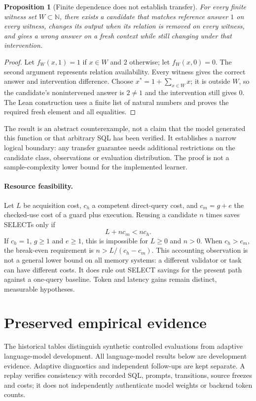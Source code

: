\documentclass[10pt,twocolumn]{article}
\newtheorem{proposition}{Proposition}
\begin{document}
\begin{proposition}[Finite dependence does not establish transfer]\label{prop:finite}
For every finite witness set $W\subset\mathbb N$, there exists a candidate that
matches reference answer $1$ on every witness, changes its output when its
relation is removed on every witness, and gives a wrong answer on a fresh
context while still changing under that intervention.
\end{proposition}
\begin{proof}
Let $f_W(x,1)=1$ if $x\in W$ and $2$ otherwise; let $f_W(x,0)=0$.
The second argument represents relation availability. Every witness gives the
correct answer and intervention difference. Choose
$x^*=1+\sum_{x\in W}x$; it is outside $W$, so the candidate's nonintervened
answer is $2\ne1$
and the intervention still gives $0$. The Lean construction uses a finite list
of natural numbers and proves the required fresh element and all equalities.
\end{proof}

The result is an abstract counterexample, not a claim that the model generated
this function or that arbitrary SQL has been verified. It establishes a narrow
logical boundary: any transfer guarantee needs additional restrictions on the
candidate class, observations or evaluation distribution. The proof is not a
sample-complexity lower bound for the implemented learner.

\paragraph{Resource feasibility.}
Let $L$ be acquisition cost, $c_h$ a competent direct-query cost, and
$c_m=g+e$ the checked-use cost of a guard plus execution. Reusing a candidate
$n$ times saves SELECTs only if
\begin{equation}\label{eq:amortization}
 L+n c_m<n c_h.
\end{equation}
If $c_h=1$, $g\geq1$ and $e\geq1$, this is impossible for $L\geq0$ and $n>0$.
When $c_h>c_m$, the break-even requirement is $n>L/(c_h-c_m)$. This accounting
observation is not a general lower bound on all memory systems: a different
validator or task can have different costs. It does rule out SELECT savings
for the present path against a one-query baseline. Token and latency gains
remain distinct, measurable hypotheses.

\section{Preserved empirical evidence}
The historical tables distinguish synthetic controlled evaluations from adaptive
language-model development. All language-model results below are development
evidence. Adaptive diagnostics
and independent follow-ups are kept separate. A replay verifies consistency
with recorded SQL, prompts, transitions, source freezes and costs; it does not
independently authenticate model weights or backend token counts.
\end{document}
